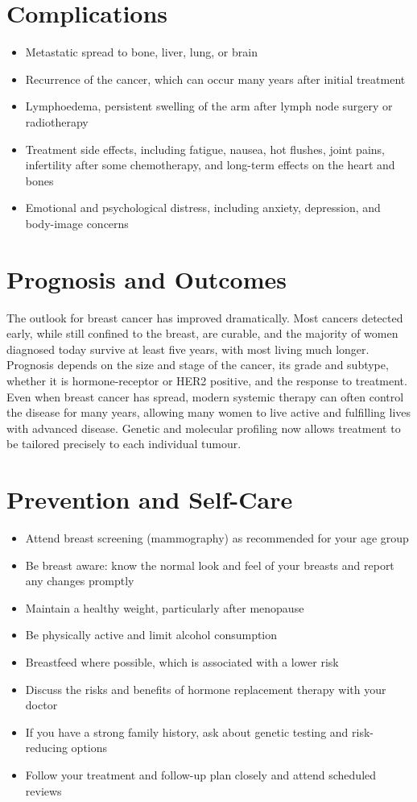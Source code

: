 \section*{Complications}
\begin{itemize}
    \item Metastatic spread to bone, liver, lung, or brain
    \item Recurrence of the cancer, which can occur many years after initial treatment
    \item Lymphoedema, persistent swelling of the arm after lymph node surgery or radiotherapy
    \item Treatment side effects, including fatigue, nausea, hot flushes, joint pains, infertility after some chemotherapy, and long-term effects on the heart and bones
    \item Emotional and psychological distress, including anxiety, depression, and body-image concerns
\end{itemize}

\section*{Prognosis and Outcomes}
The outlook for breast cancer has improved dramatically. Most cancers detected early, while still confined to the breast, are curable, and the majority of women diagnosed today survive at least five years, with most living much longer. Prognosis depends on the size and stage of the cancer, its grade and subtype, whether it is hormone-receptor or HER2 positive, and the response to treatment. Even when breast cancer has spread, modern systemic therapy can often control the disease for many years, allowing many women to live active and fulfilling lives with advanced disease. Genetic and molecular profiling now allows treatment to be tailored precisely to each individual tumour.

\section*{Prevention and Self-Care}
\begin{itemize}
    \item Attend breast screening (mammography) as recommended for your age group
    \item Be breast aware: know the normal look and feel of your breasts and report any changes promptly
    \item Maintain a healthy weight, particularly after menopause
    \item Be physically active and limit alcohol consumption
    \item Breastfeed where possible, which is associated with a lower risk
    \item Discuss the risks and benefits of hormone replacement therapy with your doctor
    \item If you have a strong family history, ask about genetic testing and risk-reducing options
    \item Follow your treatment and follow-up plan closely and attend scheduled reviews
\end{itemize}

